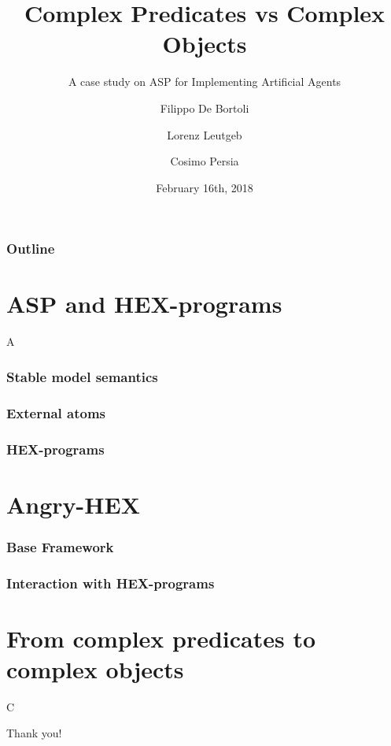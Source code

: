 \documentclass[smaller, dvipsnames]{beamer}
\title{Complex Predicates vs Complex Objects}
\subtitle{A case study on ASP for Implementing Artificial Agents}
\author{Filippo De Bortoli \and Lorenz Leutgeb \and Cosimo Persia}
\institute{European Master's Program in Computational Logic, TU Dresden}
\date{February 16th, 2018}
\newcommand{\ah}{Angry-HEX\xspace}
\begin{document}
\maketitle

\begin{frame}
    \frametitle{Outline}
\end{frame}

\section{ASP and HEX-programs}

\begin{frame}
    A
\end{frame}

\begin{frame}
    \frametitle{Stable model semantics}
\end{frame}

\begin{frame}
    \frametitle{External atoms}
\end{frame}

\begin{frame}
    \frametitle{HEX-programs}
\end{frame}

\section{\ah}

\begin{frame}
    \frametitle{Base Framework}
\end{frame}

\begin{frame}
    \frametitle{Interaction with HEX-programs}
\end{frame}

\section{From complex predicates to complex objects}

\begin{frame}
    C
\end{frame}

\begin{frame}[standout]
    Thank you!
\end{frame}
\end{document}
